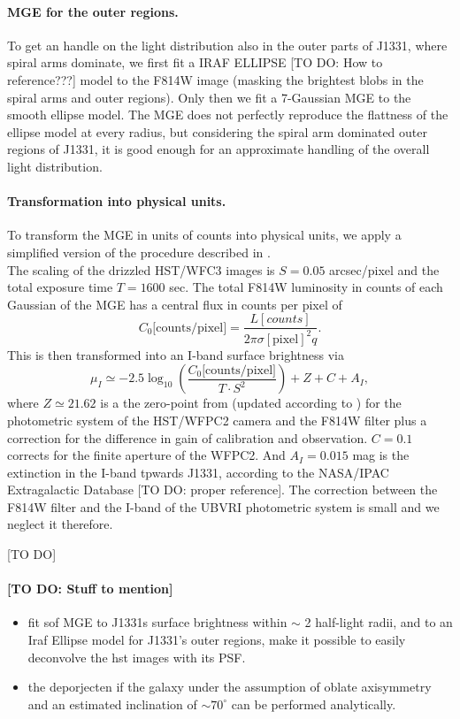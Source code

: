 \paragraph{MGE for the outer regions.} To get an handle on the light distribution also in the outer parts of J1331, where spiral arms dominate, we first fit a IRAF ELLIPSE [TO DO: How to reference???] model to the F814W image (masking the brightest blobs in the spiral arms and outer regions). Only then we fit a 7-Gaussian MGE to the smooth ellipse model. The MGE does not perfectly reproduce the flattness of the ellipse model at every radius, but considering the spiral arm dominated outer regions of J1331, it is good enough for an approximate handling of the overall light distribution.

\paragraph{Transformation into physical units.} To transform the MGE in units of counts into physical units, we apply a simplified version of the procedure described in \citet{Holtzman}.
\\The scaling of the drizzled HST/WFC3 images is  $S = 0.05$ arcsec/pixel and the total exposure time $T = 1600$ sec. The total F814W luminosity in counts of each Gaussian of the MGE has a central flux in counts per pixel of
\begin{equation*}
C_0\text{[counts/pixel]} = \frac{L[counts]}{2\pi \sigma[\text{pixel}]^2 q}.
\end{equation*}
This is then transformed into an I-band surface brightness via
\begin{equation*}
\mu_I \simeq -2.5 \log_{10}\left( \frac{C_0\text{[counts/pixel]}}{T \cdot S^2}\right) + Z + C + A_I,
\end{equation*}
where $Z\simeq21.62$ is a the zero-point from \citet{Holtzman}  (updated according to \citet{Dolphin,DolphinNew}) for the photometric system of the HST/WFPC2 camera and the F814W filter plus a correction for the difference in gain of calibration and observation. $C= 0.1$ corrects for the finite aperture of the WFPC2. And $A_I =0.015$ mag  is the extinction in the I-band tpwards J1331, according to the NASA/IPAC Extragalactic Database [TO DO: proper reference]. The correction between the F814W filter and the I-band of the UBVRI photometric system is  small \citep{Holtzman} and we neglect it therefore.

[TO DO]

\paragraph{[TO DO: Stuff to mention]}
\begin{itemize}
\item fit sof MGE to J1331s surface brightness within $\sim$ 2 half-light radii, and to an Iraf Ellipse model for J1331's outer regions, make it possible to easily deconvolve the hst images with its PSF.
\item the deporjecten if the galaxy under the assumption of oblate axisymmetry and an estimated inclination of $\sim70^\circ$ can be performed analytically.
\end{itemize}

